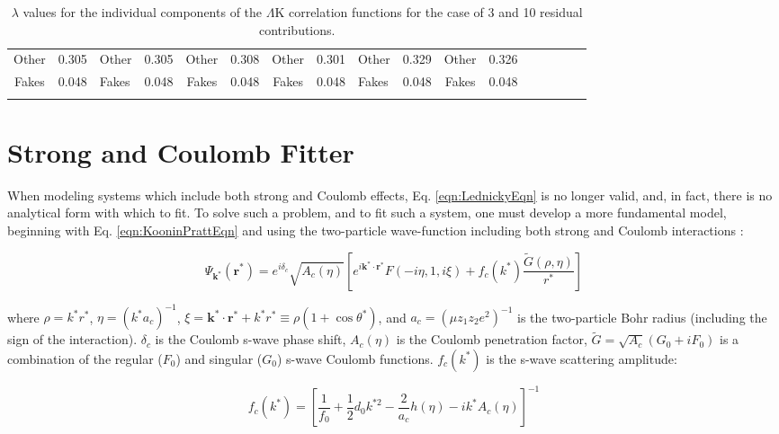 \documentclass[ALICE,manyauthors]{cernphprep}
\newcommand{\LamK}{$\Lambda$K\xspace}
\begin{document}
\begin{landscape}
\begin{table}[htbp]
{\begin{tabular}{|c|cV{5.0}c|cV{5.0}c|cV{5.0}c|cV{5.0}c|cV{5.0}c|c|}
  Other & 0.305 & Other & 0.305 & Other & 0.308 & Other & 0.301 & Other & 0.329 & Other & 0.326 \\
  Fakes & 0.048 & Fakes & 0.048 & Fakes & 0.048 & Fakes & 0.048 & Fakes & 0.048 & Fakes & 0.048 \\
 \end{tabular}}
 \caption{$\lambda$ values for the individual components of the \LamK correlation functions for the case of 3 and 10 residual contributions.}
 \label{tab:LambdaValues_All}
\end{table}

\end{landscape}
\pagestyle{plain}


\section{Strong and Coulomb Fitter}
\label{App:CoulombFitter}

When modeling systems which include both strong and Coulomb effects, Eq. \ref{eqn:LednickyEqn} is no longer valid, and, in fact, there is no analytical form with which to fit.
To solve such a problem, and to fit such a system, one must develop a more fundamental model, beginning with Eq. \ref{eqn:KooninPrattEqn} and using the two-particle wave-function including both strong and Coulomb interactions \cite{Lednicky:2005tb}:

\begin{equation}
 \Psi_{\mathbf{k^{*}}}(\mathbf{r^{*}}) = e^{i\delta_{c}}\sqrt{A_{c}(\eta)}[e^{i\mathbf{k^{*}} \cdot \mathbf{r^{*}}}F(-i\eta,1,i\xi) + f_{c}(k^{*})\frac{\tilde{G}(\rho,\eta)}{r^{*}}]
\label{eqn:CoulombWaveFcn}
\end{equation}

where $\rho = k^{*}r^{*}$, $\eta = (k^{*}a_{c})^{-1}$, $\xi = \mathbf{k^{*}} \cdot \mathbf{r^{*}} + k^{*}r^{*} \equiv \rho(1+\cos\theta^{*})$, and $a_{c} = (\mu z_{1}z_{2}e^{2})^{-1}$ is the two-particle Bohr radius (including the sign of the interaction).  
$\delta_{c}$ is the Coulomb s-wave phase shift, $A_{c}(\eta)$ is the Coulomb penetration factor, $\tilde{G} = \sqrt{A_{c}}(G_{0} + iF_{0})$ is a combination of the regular ($F_{0}$) and singular ($G_{0}$) s-wave Coulomb functions.  
$f_{c}(k^{*})$ is the s-wave scattering amplitude:

\begin{equation}
 f_{c}(k^{*}) = [\frac{1}{f_{0}} + \frac{1}{2}d_{0}k^{*2} - \frac{2}{a_{c}}h(\eta) - ik^{*}A_{c}(\eta)]^{-1}
\label{eqn:CoulombScattAmp}
\end{equation}
\end{document}
